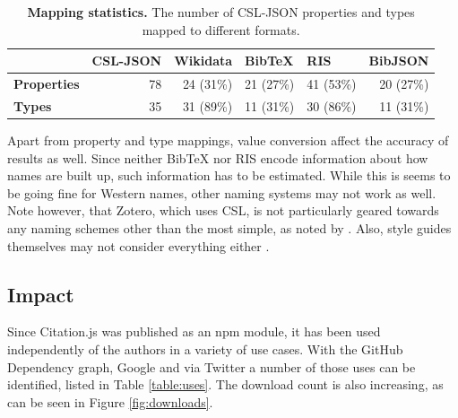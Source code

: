 \documentclass[fleqn,10pt,lineno]{wlpeerj} %
\begin{document}
\begin{table}[bt]
\caption{\textbf{Mapping statistics.} The number of CSL-JSON properties and types mapped to different formats. }
\label{table:completeness}
\begin{tabular}{l|r|r|r|r|r|}
\cline{2-6}
                                          & \multicolumn{1}{l|}{\textbf{CSL-JSON}} & \multicolumn{1}{l|}{\textbf{Wikidata}} & \multicolumn{1}{l|}{\textbf{BibTeX}} & \multicolumn{1}{l|}{\textbf{RIS}} & \multicolumn{1}{l|}{\textbf{BibJSON}} \\ \hline
\multicolumn{1}{|l|}{\textbf{Properties}} & 78                                     & 24 (31\%)                              & 21 (27\%)                            & 41 (53\%)                         & 20 (27\%)                             \\ \hline
\multicolumn{1}{|l|}{\textbf{Types}}      & 35                                     & 31 (89\%)                              & 11 (31\%)                            & 30 (86\%)                         & 11 (31\%)                             \\ \hline
\end{tabular}
\end{table}

Apart from property and type mappings, value conversion affect the accuracy of results as well. Since neither BibTeX nor RIS encode information about how names are built up, such information has to be estimated. While this is seems to be going fine for Western names, other naming systems may not work as well. Note however, that Zotero, which uses CSL, is not particularly geared towards any naming schemes other than the most simple, as noted by 
\cite{darcus_non-western_2008}. Also, style guides themselves may not consider everything either \cite{qiu_scientific_2008,puniamoorthy_give_2008}.

\subsection*{Impact}

Since Citation.js was published as an npm module, it has been used independently of the authors in a variety of use cases. With the GitHub Dependency graph, Google and via Twitter a number of those uses can be identified, listed in Table \ref{table:uses}. The download count is also increasing, as can be seen in Figure \ref{fig:downloads}.
\end{document}
